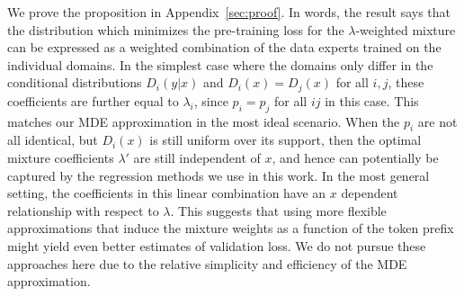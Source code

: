 We prove the proposition in Appendix~\ref{sec:proof}. In words, the result says that the distribution which minimizes the pre-training loss for the $\lambda$-weighted mixture can be expressed as a weighted combination of the data experts trained on the individual domains. In the simplest case where the domains only differ in the conditional distributions $D_i(y|x)$ and $D_i(x) = D_j(x)$ for all $i, j$, these coefficients are further equal to $\lambda_i$, since $p_i = p_j$ for all $i j$ in this case. This matches our MDE approximation in the most ideal scenario. When the $p_i$ are not all identical, but $D_i(x)$ is still uniform over its support, then the optimal mixture coefficients $\lambda'$ are still independent of $x$, and hence can potentially be captured by the regression methods we use in this work. In the most general setting, the coefficients in this linear combination have an $x$ dependent relationship with respect to $\lambda$. This suggests that using more flexible approximations that induce the mixture weights as a function of the token prefix might yield even better estimates of validation loss. We do not pursue these approaches here due to the relative simplicity and efficiency of the MDE approximation.

